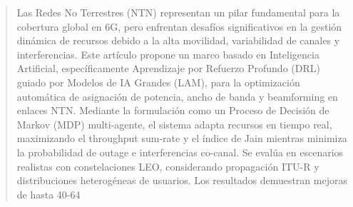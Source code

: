 \begin{abstract}
Las Redes No Terrestres (NTN) representan un pilar fundamental para la cobertura global en 6G, pero enfrentan desafíos significativos en la gestión dinámica de recursos debido a la alta movilidad, variabilidad de canales y interferencias. Este artículo propone un marco basado en Inteligencia Artificial, específicamente Aprendizaje por Refuerzo Profundo (DRL) guiado por Modelos de IA Grandes (LAM), para la optimización automática de asignación de potencia, ancho de banda y beamforming en enlaces NTN. Mediante la formulación como un Proceso de Decisión de Markov (MDP) multi-agente, el sistema adapta recursos en tiempo real, maximizando el throughput sum-rate y el índice de Jain mientras minimiza la probabilidad de outage e interferencias co-canal. Se evalúa en escenarios realistas con constelaciones LEO, considerando propagación ITU-R y distribuciones heterogéneas de usuarios. Los resultados demuestran mejoras de hasta 40-64%
\end{abstract}